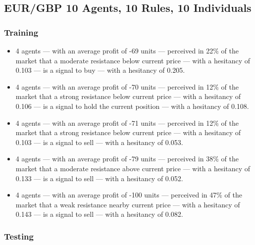 \subsection{EUR/GBP 10 Agents, 10 Rules, 10 Individuals}
\label{results:interpretation-eur-gbp-10agents-10rules-10individuals}

\subsubsection{Training}

{\small
  \begin{itemize}
  \item 4 agents — with an average profit of -69 units — perceived in 22\% of
    the market that a moderate resistance below current price — with a hesitancy
    of 0.103 — is a signal to buy — with a hesitancy of 0.205.
  \item 4 agents — with an average profit of -70 units — perceived in 12\% of
    the market that a strong resistance below current price — with a hesitancy
    of 0.106 — is a signal to hold the current position — with a hesitancy of
    0.108.
  \item 4 agents — with an average profit of -71 units — perceived in 12\% of
    the market that a strong resistance below current price — with a hesitancy
    of 0.103 — is a signal to sell — with a hesitancy of 0.053.
  \item 4 agents — with an average profit of -79 units — perceived in 38\% of
    the market that a moderate resistance above current price — with a hesitancy
    of 0.133 — is a signal to sell — with a hesitancy of 0.052.
  \item 4 agents — with an average profit of -100 units — perceived in 47\% of
    the market that a weak resistance nearby current price — with a hesitancy of
    0.143 — is a signal to sell — with a hesitancy of 0.082.
  \end{itemize}
}

\subsubsection{Testing}

